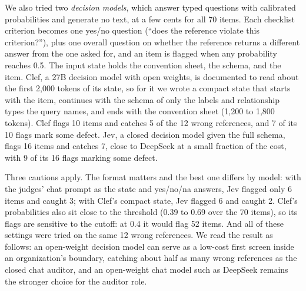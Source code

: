 We also tried two \emph{decision models}, which answer typed questions with calibrated probabilities and generate no text, at a few cents for all 70 items. Each checklist criterion becomes one yes/no question (``does the reference violate this criterion?''), plus one overall question on whether the reference returns a different answer from the one asked for, and an item is flagged when any probability reaches 0.5. The input state holds the convention sheet, the schema, and the item. Clef, a 27B decision model with open weights, is documented to read about the first 2,000 tokens of its state, so for it we wrote a compact state that starts with the item, continues with the schema of only the labels and relationship types the query names, and ends with the convention sheet (1,200 to 1,800 tokens). Clef flags 10 items and catches 5 of the 12 wrong references, and 7 of its 10 flags mark some defect. Jev, a closed decision model given the full schema, flags 16 items and catches 7, close to DeepSeek at a small fraction of the cost, with 9 of its 16 flags marking some defect.

Three cautions apply. The format matters and the best one differs by model: with the judges' chat prompt as the state and yes/no/na answers, Jev flagged only 6 items and caught 3; with Clef's compact state, Jev flagged 6 and caught 2. Clef's probabilities also sit close to the threshold (0.39 to 0.69 over the 70 items), so its flags are sensitive to the cutoff: at 0.4 it would flag 52 items. And all of these settings were tried on the same 12 wrong references. We read the result as follows: an open-weight decision model can serve as a low-cost first screen inside an organization's boundary, catching about half as many wrong references as the closed chat auditor, and an open-weight chat model such as DeepSeek remains the stronger choice for the auditor role.

